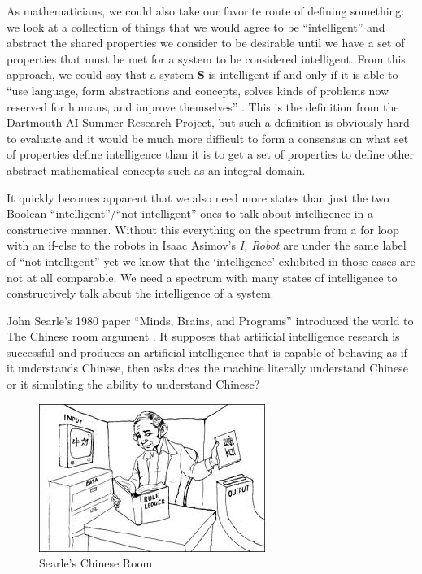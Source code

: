 \documentclass[oneside,12pt,openany]{book}
\begin{document}
	As mathematicians, we could also take our favorite route of defining something: we look at a collection of things that we would agree to be ``intelligent'' and abstract the shared properties we consider to be desirable until we have a set of properties that must be met for a system to be considered intelligent. From this approach, we could say that a system \textbf{S} is intelligent if and only if it is able to ``use language, form abstractions and concepts, solves kinds of problems now reserved for humans, and improve themselves'' \cite{Jones}. This is the definition from the Dartmouth AI Summer Research Project, but such a definition is obviously hard to evaluate and it would be much more difficult to form a consensus on what set of properties define intelligence than it is to get a set of properties to define other abstract mathematical concepts such as an integral domain.
	
	It quickly becomes apparent that we also need more states than just the two Boolean ``intelligent''/``not intelligent'' ones to talk about intelligence in a constructive manner. Without this everything on the spectrum from a for loop with an if-else to the robots in Isaac Asimov's \textit{I, Robot}  are under the same label of ``not intelligent'' yet we know that the `intelligence' exhibited in those cases are not at all comparable. We need a spectrum with many states of intelligence to constructively talk about the intelligence of a system.
	
	John Searle's 1980 paper ``Minds, Brains, and Programs'' introduced the world to The Chinese room argument \cite{Searle}. It supposes that artificial intelligence research is successful and produces an artificial intelligence that is capable of behaving as if it understands Chinese, then asks does the machine literally understand Chinese or it simulating the ability to understand Chinese? \cite{Searle} 
	
	\begin{figure}[hbt!]
		\centering
		\includegraphics[width=.4\linewidth]{images/ChineseRoom.jpg}
		\caption[Searle's Chinese Room]{Searle's Chinese Room\footnotemark}
		\label{fig:ChineseRoom}
	\end{figure}
	
\end{document}
